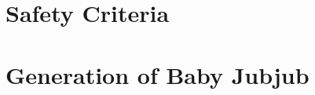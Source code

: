 \documentclass{article}
\theoremstyle{definition}
\theoremstyle{remark}
\begin{document}
\begin{spacing}{1.2}
\section{Safety Criteria} \label{ap-safe}
\vspace{0.2cm}

\vspace{0.4cm}

\section{Generation of Baby Jubjub} \label{ap-baby}
\vspace{0.2cm}


\end{spacing}	
\end{document}

